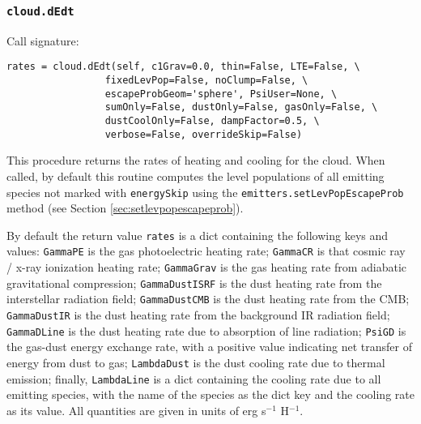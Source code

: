 \documentclass[12pt]{article}
\begin{document}
\subsubsection{\texttt{cloud.dEdt}}
\label{sec:dEdt}

Call signature:

\begin{verbatim}
rates = cloud.dEdt(self, c1Grav=0.0, thin=False, LTE=False, \
                 fixedLevPop=False, noClump=False, \
                 escapeProbGeom='sphere', PsiUser=None, \
                 sumOnly=False, dustOnly=False, gasOnly=False, \
                 dustCoolOnly=False, dampFactor=0.5, \
                 verbose=False, overrideSkip=False)
\end{verbatim}

This procedure returns the rates of heating and cooling for the cloud. When called, by default this routine computes the level populations of all emitting species not marked with \verb=energySkip= using the \verb=emitters.setLevPopEscapeProb= method (see Section \ref{sec:setlevpopescapeprob}).

By default the return value \verb=rates= is a dict containing the following keys and values: \verb=GammaPE= is the gas photoelectric heating rate; \verb=GammaCR= is that cosmic ray / x-ray ionization heating rate; \verb=GammaGrav= is the gas heating rate from adiabatic gravitational compression; \verb=GammaDustISRF= is the dust heating rate from the interstellar radiation field; \verb=GammaDustCMB= is the dust heating rate from the CMB; \verb=GammaDustIR= is the dust heating rate from the background IR radiation field; \verb=GammaDLine= is the dust heating rate due to absorption of line radiation; \verb=PsiGD= is the gas-dust energy exchange rate, with a positive value indicating net transfer of energy from dust to gas; \verb=LambdaDust= is the dust cooling rate due to thermal emission; finally, \verb=LambdaLine= is a dict containing the cooling rate due to all emitting species, with the name of the species as the dict key and the cooling rate as its value. All quantities are given in units of erg s$^{-1}$ H$^{-1}$.
\end{document}
